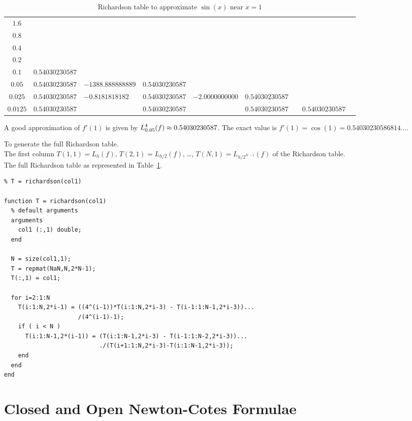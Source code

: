\begin{egg}
\begin{table}
\begin{sideways}
\begin{tabular}{c|llllllll}
\hline
$1.6$ && && && && \\
$0.8$ && && && && \\
$0.4$ && && && && \\
$0.2$ && && && && \\
$0.1$ & $0.54030230587$ & && && && \\
$0.05$ & $0.54030230587$ & $-1388.888888889$ & $0.54030230587$ & && && \\
$0.025$ & $0.54030230587$ & $-0.8181818182$ & $0.54030230587$ &
$-2.0000000000$ & $0.54030230587$ & && \\
$0.0125$ & $0.54030230587$ & & $0.54030230587$ & & $0.54030230587$
& & $0.54030230587$ &
\end{tabular}
\end{sideways}
\caption{Richardson table to approximate $\sin(x)$ near
$x=1$}\label{rich_comp}
\end{table}

A good approximation of $f'(1)$ is given by
$\displaystyle L_{0.05}^4(f) \approx 0.54030230587$.  The exact value is
$f'(1) = \cos(1) = 0.54030230586814\ldots$.
\end{egg}

\begin{code}
To generate the full Richardson table. \\
 The first column $T(1,1) = L_h(f)$, $T(2,1)= L_{h/2}(f)$,
\ldots, $T(N,1) = L_{h/2^{N-1}}(f)$ of the Richardson table.\\
 The full Richardson table as represented in
Table~\ref{rich_comp}.
\small
\begin{verbatim}
% T = richardson(col1)

function T = richardson(col1)
  % default arguments
  arguments
    col1 (:,1) double;
  end

  N = size(col1,1);
  T = repmat(NaN,N,2*N-1);
  T(:,1) = col1;
    
  for i=2:1:N
    T(i:1:N,2*i-1) = ((4^(i-1))*T(i:1:N,2*i-3) - T(i-1:1:N-1,2*i-3))...
                     /(4^(i-1)-1);
    if ( i < N )
      T(i:1:N-1,2*(i-1)) = (T(i:1:N-1,2*i-3) - T(i-1:1:N-2,2*i-3))...
                           ./(T(i+1:1:N,2*i-3)-T(i:1:N-1,2*i-3));
    end
  end
end
\end{verbatim}
\end{code}

\section{Closed and Open Newton-Cotes Formulae}

